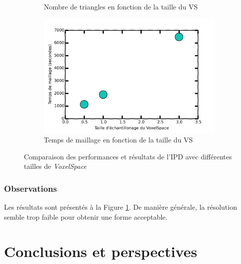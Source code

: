\documentclass[a4paper,10pt]{report}
\begin{document}
\begin{figure}[h!]
\begin{subfigure}[b]{0.3\textwidth}
        \caption{Nombre de triangles en fonction de la taille du VS}
    \end{subfigure}
    \begin{subfigure}[b]{0.3\textwidth}
	    \includegraphics[width=\textwidth]{results/vs-time-cmp.png}
        \caption{Temps de maillage en fonction de la taille du VS}
    \end{subfigure}
    \caption{\label{fig:vscmp} Comparaison des performances et résultats de l'IPD avec différentes tailles de \textit{VoxelSpace}}
\end{figure}

\subsection{Observations}
Les résultats sont présentés à la Figure \ref{fig:vscmp}. De manière générale, la résolution semble trop faible pour obtenir une forme acceptable.

\chapter{Conclusions et perspectives}
\end{document}
